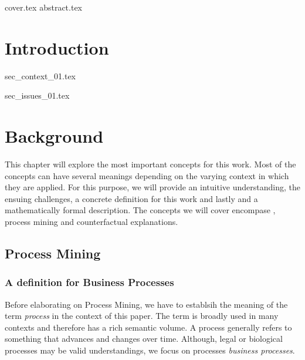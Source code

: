 \documentclass[12pt,a4paper]{report}
\begin{document}
{cover.tex}
{abstract.tex}


\tableofcontents
\printglossary[type=acronym, title=List of terms, toctitle=List of terms]


\chapter{Introduction}
\label{sec:intro}

{sec_context_01.tex}

{sec_issues_01.tex}

\chapter{Background}
\label{sec:prereq}
This chapter will explore the most important concepts for this work. Most of the concepts can have several meanings depending on the varying context in which they are applied. For this purpose, we will provide an intuitive understanding, the ensuing challenges, a concrete definition for this work and lastly and a mathematically formal description. The concepts we will cover encompase , process mining and counterfactual explanations.


\section{Process Mining}
\label{sec:process}

\subsection{A definition for Business Processes}
Before elaborating on Process Mining, we have to establsih the meaning of the term \emph{process} in the context of this paper. The term is broadly used in many contexts and therefore has a rich semantic volume. A process generally refers to something that advances and changes over time\autocite{_DefinitionPROCESS_}.
Although, legal or biological processes may be valid understandings, we focus on processes \emph{business processes}.
\end{document}
